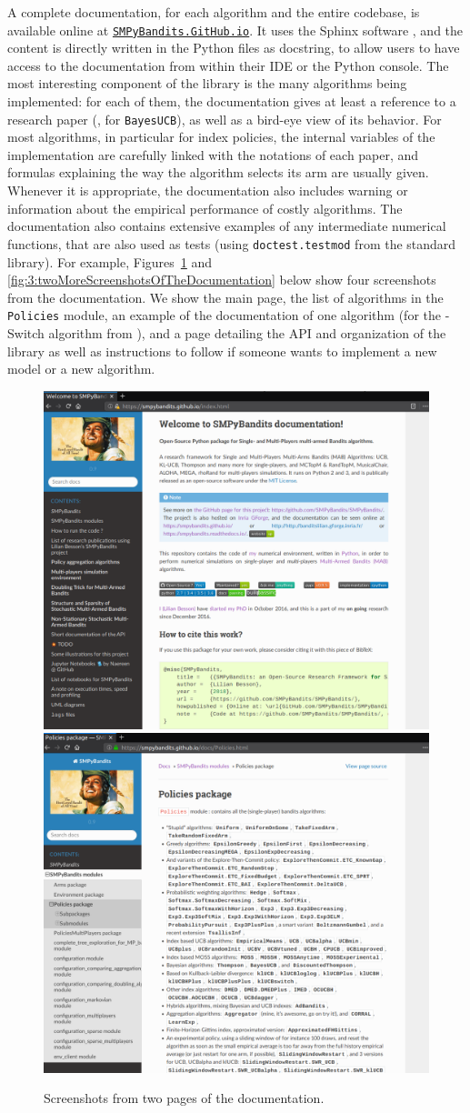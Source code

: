 A complete documentation, for each algorithm and the entire codebase, is available online at
\texttt{\href{https://SMPyBandits.GitHub.io}{SMPyBandits.GitHub.io}}.
It uses the Sphinx software \cite{sphinx}, and the content is directly written in the Python files as docstring, to allow users to have access to the documentation from within their IDE or the Python console.
The most interesting component of the library is the many algorithms being implemented: for each of them, the documentation gives at least a reference to a research paper (\eg, \cite{Kaufmann12BUCB} for \texttt{BayesUCB}), as well as a bird-eye view of its behavior.
For most algorithms, in particular for index policies, the internal variables of the implementation are carefully linked with the notations of each paper, and formulas explaining the way the algorithm selects its arm are usually given.
Whenever it is appropriate, the documentation also includes warning or information about the empirical performance of costly algorithms.
The documentation also contains extensive examples of any intermediate numerical functions, that are also used as tests (using \texttt{doctest.testmod} from the standard library).
For example, Figures~\ref{fig:3:twoScreenshotsOfTheDocumentation} and \ref{fig:3:twoMoreScreenshotsOfTheDocumentation} below show four screenshots from the documentation.
We show the main page, the list of algorithms in the \texttt{Policies} module, an example of the documentation of one algorithm (for the \klUCB-Switch algorithm from \cite{Garivier18}), and a page detailing the API and organization of the library as well as instructions to follow if someone wants to implement a new model or a new algorithm.

\begin{figure}[h!]  %
    \centering
	\includegraphics[width=0.49\linewidth]{overview_documentation_1.png}
    \includegraphics[width=0.49\linewidth]{overview_documentation_2.png}
	\caption{Screenshots from two pages of the documentation.}
	\label{fig:3:twoScreenshotsOfTheDocumentation}
\end{figure}

